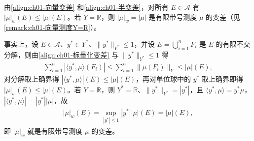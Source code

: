 \documentclass[../../main.tex]{subfiles}%
\begin{document}
\begin{remark}\label{remark:ch01-半变差性质}
由\eqref{align:ch01-向量变差} 和\eqref{align:ch01-半变差}，对所有 $E\in\mathcal{A}$ 有 $|\mu|_w(E)\leqslant|\mu|(E)$。若 $Y=\mathbb{R}$，则 $|\mu|_w=|\mu|$ 是有限带号测度 $\mu$ 的变差（见\cref{remark:ch01-向量测度Y=R}）。

事实上，设 $E\in\mathcal{A}$、$y^*\in Y^*$、$\|y^*\|_{Y^*}\leqslant1$，并设 $E=\bigcup_{i=1}^n F_i$ 是 $E$ 的有限不交分解，则由\eqref{align:ch01-标量化变差} 与 $\|y^*\|_{Y^*}\leqslant1$ 得
\begin{align*}
\sum_{i=1}^n\left|\langle y^*,\mu\rangle(F_i)\right|\leqslant\sum_{i=1}^n\|\mu(F_i)\|_Y\leqslant|\mu|(E),
\end{align*}
对分解取上确界得 $\left|\langle y^*,\mu\rangle\right|(E)\leqslant|\mu|(E)$，再对单位球中的 $y^*$ 取上确界即得 $|\mu|_w(E)\leqslant|\mu|(E)$。若 $Y=\mathbb{R}$，则 $Y^*=\mathbb{R}$、$\|y^*\|_{Y^*}=|y^*|$，且 $\langle y^*,\mu\rangle=y^*\mu$，$\left|\langle y^*,\mu\rangle\right|=|y^*||\mu|$，故
\begin{align*}
|\mu|_w(E)=\sup_{|y^*|\leqslant1}|y^*||\mu|(E)=|\mu|(E),
\end{align*}
即 $|\mu|_w$ 就是有限带号测度 $\mu$ 的变差。
\end{remark}
\end{document}
